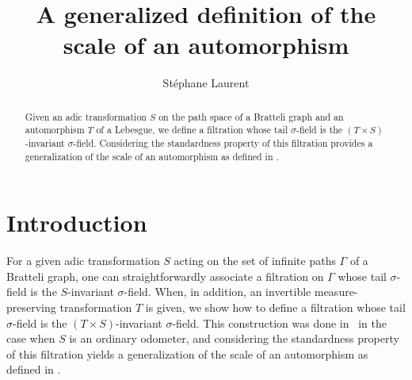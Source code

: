 \documentclass[12pt,a4paper]{article}
\author{Stéphane Laurent}
\title{A generalized definition of the scale of an automorphism}
\begin{document}
\theoremstyle{defstyle}
\newtheorem{definition}{Definition}
\newtheorem{remark}{Remark}
\newtheorem{question}{Question}
\newtheorem{clarify}{To clarify}
\theoremstyle{thmstyle}
\newtheorem{thm}{Theorem}[section]
\newtheorem{ppsition}{Proposition}
\newtheorem{lemma}{Lemma}

\newcommand{\BB}{\mathcal{B}}
\newcommand{\CC}{\mathcal{C}}
\newcommand{\EEE}{\mathcal{E}}
\newcommand{\FF}{\mathcal{F}}
\newcommand{\GG}{\mathcal{G}}
\newcommand{\tildGG}{\widetilde{\GG}}
\newcommand{\HH}{\mathcal{H}}
\newcommand{\EE}{\mathbb{E}}
\newcommand{\II}{\mathcal{I}}
\newcommand{\LL}{\mathcal{L}}
\newcommand{\OO}{\mathcal{O}}
\newcommand{\UU}{\mathcal{U}}
\newcommand{\XX}{\mathcal{X}}
\newcommand{\given}{\mid}
\newcommand{\eps}{\epsilon}
\newcommand{\indic}{\boldsymbol 1}
\newcommand{\Vb}{\boldsymbol V}
\newcommand{\tildV}{\widetilde{V}}
\newcommand{\tildW}{\widetilde{W}}
\newcommand{\tildX}{\widetilde{X}}
\newcommand{\tildeps}{\widetilde{\epsilon}}


\newcommand{\indvee}{\dot{\vee}}
\newcommand{\indep}{\mathrel{\text{\scalebox{1.07}{$\perp\mkern-10mu\perp$}}}}

\maketitle

\begin{abstract}
Given an adic transformation $S$ on the path space of a Bratteli graph and 
an automorphism $T$ of a Lebesgue, we define a filtration whose 
tail $\sigma$-field is the $(T \times S)$-invariant $\sigma$-field. 
Considering the standardness property of this filtration provides 
a generalization of the scale of an automorphism as defined in 
\cite{LauXLV}.
\end{abstract}

\section{Introduction} 

For a given adic transformation $S$ acting on the set of infinite paths $\Gamma$ of a 
Bratteli graph, one can straightforwardly associate a filtration on $\Gamma$ whose 
tail $\sigma$-field is the $S$-invariant $\sigma$-field. 
When, in addition, an invertible measure-preserving transformation $T$ 
is given, we show how to define a filtration whose tail $\sigma$-field 
is the $(T\times S)$-invariant $\sigma$-field. 
This construction was done in~\cite{LauXLV} in the case when $S$ 
is an ordinary odometer, and considering the standardness property 
of this filtration yields  
a generalization of the scale of an automorphism as defined in 
\cite{LauXLV}.
 
\end{document}
